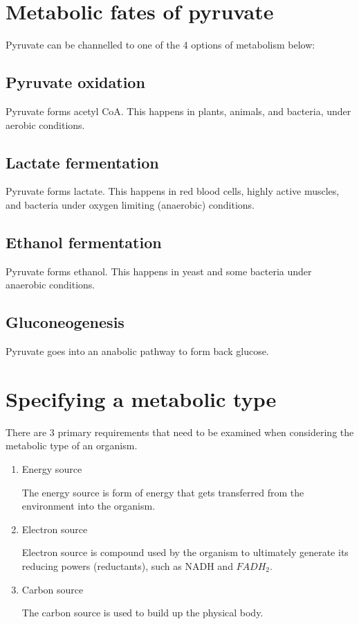 \documentclass[11pt]{article}
\begin{document}
\newpage
\section{Metabolic fates of pyruvate}
\label{sec:org43384f9}
Pyruvate can be channelled to one of the 4 options of metabolism below:
\subsection{Pyruvate oxidation}
\label{sec:orgc25ead4}
Pyruvate forms acetyl CoA. This happens in plants, animals, and bacteria, under aerobic conditions.
\subsection{Lactate fermentation}
\label{sec:orge5dc811}
Pyruvate forms lactate. This happens in red blood cells, highly active muscles, and bacteria under oxygen limiting (anaerobic) conditions.
\subsection{Ethanol fermentation}
\label{sec:orge9f9b8a}
Pyruvate forms ethanol. This happens in yeast and some bacteria under anaerobic conditions.
\subsection{Gluconeogenesis}
\label{sec:org76916af}
Pyruvate goes into an anabolic pathway to form back glucose.
\section{Specifying a metabolic type}
\label{sec:org2d6cb89}
There are 3 primary requirements that need to be examined when considering the metabolic type of an organism.
\begin{enumerate}
\item Energy source
\label{sec:org6313433}

The energy source is form of energy that gets transferred from the environment into the organism.
\item Electron source
\label{sec:org6308bc1}

Electron source is compound used by the organism to ultimately generate its reducing powers (reductants), such as NADH and \(FADH_2\).
\item Carbon source
\label{sec:orgf982c81}

The carbon source is used to build up the physical body.
\end{enumerate}
\end{document}
